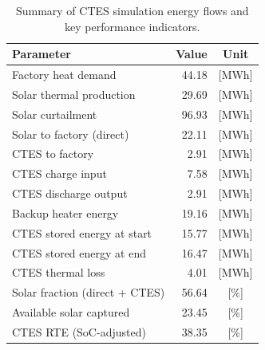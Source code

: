 \renewcommand{\arraystretch}{1.2}
\begin{table}[h]
\centering
\begin{tabular}{l|r c}
\hline
Parameter & Value & Unit \\
\hline
Factory heat demand & 44.18 & [MWh] \\
Solar thermal production & 29.69 & [MWh] \\
Solar curtailment & 96.93 & [MWh] \\
Solar to factory (direct) & 22.11 & [MWh] \\
CTES to factory & 2.91 & [MWh] \\
CTES charge input & 7.58 & [MWh] \\
CTES discharge output & 2.91 & [MWh] \\
Backup heater energy & 19.16 & [MWh] \\
CTES stored energy at start & 15.77 & [MWh] \\
CTES stored energy at end & 16.47 & [MWh] \\
CTES thermal loss & 4.01 & [MWh] \\
\hline
Solar fraction (direct + CTES) & 56.64 & [\%] \\
Available solar captured & 23.45 & [\%] \\
CTES RTE (SoC-adjusted) & 38.35 & [\%] \\
\hline
\end{tabular}
\caption{Summary of CTES simulation energy flows and key performance indicators.}
\label{tab:ctes-simulation-summary}
\end{table}
